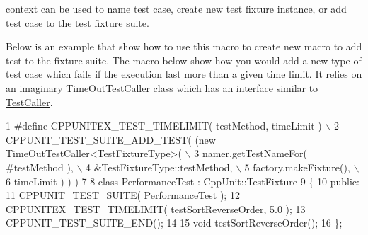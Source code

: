 {\ttfamily context} can be used to name test case, create new test fixture instance, or add test case to the test fixture suite.

Below is an example that show how to use this macro to create new macro to add test to the fixture suite. The macro below show how you would add a new type of test case which fails if the execution last more than a given time limit. It relies on an imaginary Time\+Out\+Test\+Caller class which has an interface similar to \hyperlink{class_test_caller}{Test\+Caller}.


\begin{DoxyCode}
1 #define CPPUNITEX\_TEST\_TIMELIMIT( testMethod, timeLimit )            \(\backslash\)
2      CPPUNIT\_TEST\_SUITE\_ADD\_TEST( (new TimeOutTestCaller<TestFixtureType>(  \(\backslash\)
3                  namer.getTestNameFor( #testMethod ),                \(\backslash\)
4                  &TestFixtureType::testMethod,                   \(\backslash\)
5                  factory.makeFixture(),                              \(\backslash\)
6                  timeLimit ) ) )
7   
8 class PerformanceTest : CppUnit::TestFixture
9 \{
10 public:
11   CPPUNIT\_TEST\_SUITE( PerformanceTest );
12   CPPUNITEX\_TEST\_TIMELIMIT( testSortReverseOrder, 5.0 );
13   CPPUNIT\_TEST\_SUITE\_END();
14 
15   void testSortReverseOrder();
16 \};
\end{DoxyCode}



